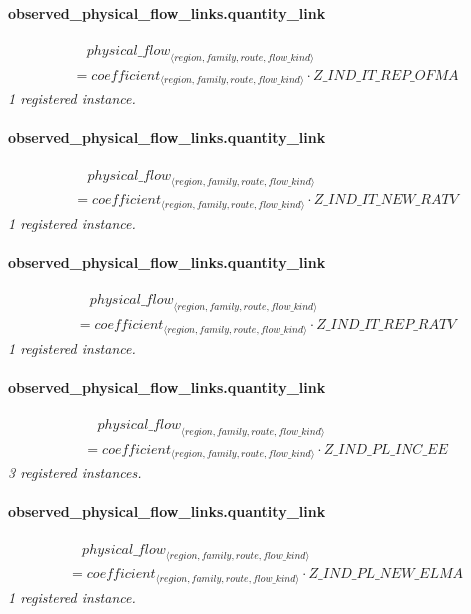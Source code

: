 \documentclass[11pt]{article}
\begin{document}
\paragraph{observed\_physical\_flow\_links.quantity\_link}
\begin{align*}
&\quad {physical\_flow}_{\langle region, family, route, flow\_kind\rangle}\\
&= coefficient_{\langle region, family, route, flow\_kind\rangle} \cdot Z\_IND\_IT\_REP\_OFMA
\end{align*}
\noindent\emph{1 registered instance.}\par
\paragraph{observed\_physical\_flow\_links.quantity\_link}
\begin{align*}
&\quad {physical\_flow}_{\langle region, family, route, flow\_kind\rangle}\\
&= coefficient_{\langle region, family, route, flow\_kind\rangle} \cdot Z\_IND\_IT\_NEW\_RATV
\end{align*}
\noindent\emph{1 registered instance.}\par
\paragraph{observed\_physical\_flow\_links.quantity\_link}
\begin{align*}
&\quad {physical\_flow}_{\langle region, family, route, flow\_kind\rangle}\\
&= coefficient_{\langle region, family, route, flow\_kind\rangle} \cdot Z\_IND\_IT\_REP\_RATV
\end{align*}
\noindent\emph{1 registered instance.}\par
\paragraph{observed\_physical\_flow\_links.quantity\_link}
\begin{align*}
&\quad {physical\_flow}_{\langle region, family, route, flow\_kind\rangle}\\
&= coefficient_{\langle region, family, route, flow\_kind\rangle} \cdot Z\_IND\_PL\_INC\_EE
\end{align*}
\noindent\emph{3 registered instances.}\par
\paragraph{observed\_physical\_flow\_links.quantity\_link}
\begin{align*}
&\quad {physical\_flow}_{\langle region, family, route, flow\_kind\rangle}\\
&= coefficient_{\langle region, family, route, flow\_kind\rangle} \cdot Z\_IND\_PL\_NEW\_ELMA
\end{align*}
\noindent\emph{1 registered instance.}\par
\end{document}
